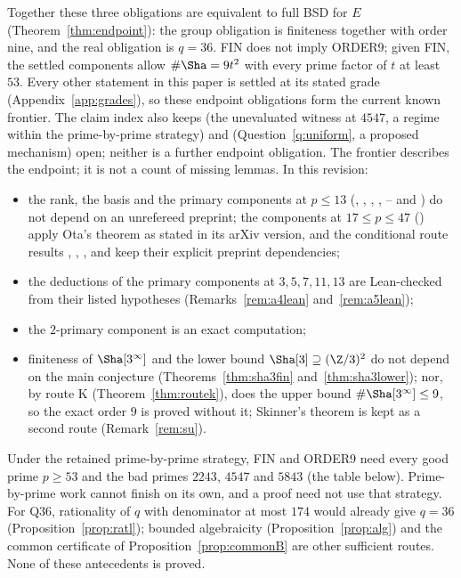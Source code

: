 Together these three obligations are equivalent to full BSD for $E$ (Theorem~\ref{thm:endpoint}): the group obligation is finiteness together with order nine, and the real obligation is $q=36$. FIN does not imply ORDER9; given FIN, the settled components allow $\#\Sha=9t^2$ with every prime factor of $t$ at least $53$. Every other statement in this paper is settled at its stated grade (Appendix~\ref{app:grades}), so these endpoint obligations form the current known frontier. The claim index also keeps  (the unevaluated witness at $4547$, a regime within the prime-by-prime strategy) and  (Question~\ref{q:uniform}, a proposed mechanism) open; neither is a further endpoint obligation. The frontier describes the endpoint; it is not a count of missing lemmas. In this revision:
\begin{itemize}[leftmargin=*]
\item the rank, the basis and the primary components at $p\le13$ (, , , , -- and ) do not depend on an unrefereed preprint; the components at $17\le p\le47$ () apply Ota's theorem as stated in its arXiv version, and the conditional route results , , ,  and  keep their explicit preprint dependencies;
\item the deductions of the primary components at $3,5,7,11,13$ are Lean-checked from their listed hypotheses (Remarks~\ref{rem:a4lean} and~\ref{rem:a5lean});
\item the $2$-primary component is an exact computation;
\item finiteness of $\Sha[3^\infty]$ and the lower bound $\Sha[3]\supseteq(\Z/3)^2$ do not depend on the main conjecture (Theorems~\ref{thm:sha3fin} and~\ref{thm:sha3lower}); nor, by route K (Theorem~\ref{thm:routek}), does the upper bound $\#\Sha[3^\infty]\le9$, so the exact order $9$ is proved without it; Skinner's theorem is kept as a second route (Remark~\ref{rem:su}).
\end{itemize}
Under the retained prime-by-prime strategy, FIN and ORDER9 need every good prime $p\ge53$ and the bad primes $2243$, $4547$ and $5843$ (the table below). Prime-by-prime work cannot finish on its own, and a proof need not use that strategy. For Q36, rationality of $q$ with denominator at most $174$ would already give $q=36$ (Proposition~\ref{prop:ratl}); bounded algebraicity (Proposition~\ref{prop:alg}) and the common certificate of Proposition~\ref{prop:commonB} are other sufficient routes. None of these antecedents is proved.

